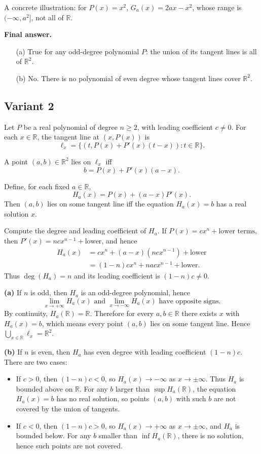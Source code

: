 \documentclass[12pt,a4paper]{article}
\theoremstyle{definition}
\begin{document}
    A concrete illustration: for $P(x) = x^2$, $G_a(x) = 2ax - x^2$, whose range is $(-\infty, a^2]$, not all of $\mathbb{R}$.

    \textbf{Final answer.}
    \begin{enumerate}
        \item[(a)] True for any odd-degree polynomial $P$: the union of its tangent lines is all of $\mathbb{R}^2$.
        \item[(b)] No. There is no polynomial of even degree whose tangent lines cover $\mathbb{R}^2$.
    \end{enumerate}

    \subsection{Variant 2}
    Let $P$ be a real polynomial of degree $n \geq 2$, with leading coefficient $c \neq 0$. For each $x \in \mathbb{R}$, the tangent line at $(x, P(x))$ is
    $$\ell_x = \{ (t, P(x) + P'(x)(t - x)) : t \in \mathbb{R} \}.$$

    A point $(a, b) \in \mathbb{R}^2$ lies on $\ell_x$ iff
    $$b = P(x) + P'(x)(a - x).$$

    Define, for each fixed $a \in \mathbb{R}$,
    $$H_a(x) = P(x) + (a - x) P'(x).$$
    Then $(a, b)$ lies on some tangent line iff the equation $H_a(x) = b$ has a real solution $x$.

    Compute the degree and leading coefficient of $H_a$. If $P(x) = c x^n + \text{lower terms}$, then $P'(x) = n c x^{n-1} + \text{lower}$, and hence
    \begin{align}
        H_a(x) &= c x^n + (a - x)(n c x^{n-1}) + \text{lower} \\
        &= (1 - n) c x^n + n a c x^{n-1} + \text{lower}.
    \end{align}
    Thus $\deg(H_a) = n$ and its leading coefficient is $(1 - n)c \neq 0$.

    \textbf{(a)} If $n$ is odd, then $H_a$ is an odd-degree polynomial, hence
    $$\lim_{x\to+\infty} H_a(x) \text{ and } \lim_{x\to-\infty} H_a(x) \text{ have opposite signs}.$$
    By continuity, $H_a(\mathbb{R}) = \mathbb{R}$. Therefore for every $a, b \in \mathbb{R}$ there exists $x$ with $H_a(x) = b$, which means every point $(a, b)$ lies on some tangent line. Hence $\bigcup_{x\in\mathbb{R}} \ell_x = \mathbb{R}^2$.

    \textbf{(b)} If $n$ is even, then $H_a$ has even degree with leading coefficient $(1 - n)c$. There are two cases:
    \begin{itemize}
        \item If $c > 0$, then $(1 - n)c < 0$, so $H_a(x) \to -\infty$ as $x \to \pm\infty$. Thus $H_a$ is bounded above on $\mathbb{R}$. For any $b$ larger than $\sup H_a(\mathbb{R})$, the equation $H_a(x) = b$ has no real solution, so points $(a, b)$ with such $b$ are not covered by the union of tangents.
        \item If $c < 0$, then $(1 - n)c > 0$, so $H_a(x) \to +\infty$ as $x \to \pm\infty$, and $H_a$ is bounded below. For any $b$ smaller than $\inf H_a(\mathbb{R})$, there is no solution, hence such points are not covered.
    \end{itemize}
\end{document}
